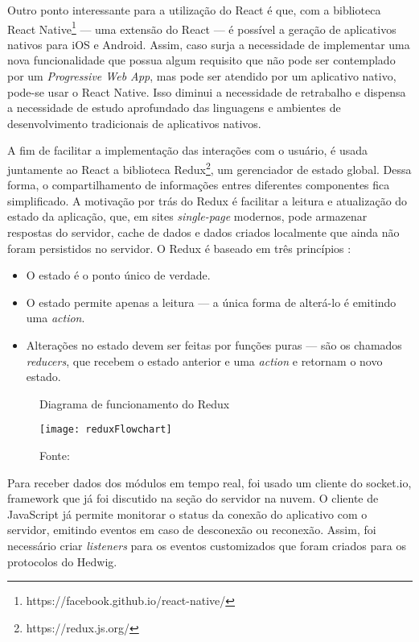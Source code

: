 Outro ponto interessante para a utilização do React é que, com a biblioteca React Native\footnote{https://facebook.github.io/react-native/} --- uma extensão do React --- é possível a geração de aplicativos nativos para iOS e Android. Assim, caso surja a necessidade de implementar uma nova funcionalidade que possua algum requisito que não pode ser contemplado por um \textit{Progressive Web App}, mas pode ser atendido por um aplicativo nativo, pode-se usar o React Native. Isso diminui a necessidade de retrabalho e dispensa a necessidade de estudo aprofundado das linguagens e ambientes de desenvolvimento tradicionais de aplicativos nativos.

A fim de facilitar a implementação das interações com o usuário, é usada juntamente ao React a biblioteca Redux\footnote{https://redux.js.org/}, um gerenciador de estado global. Dessa forma, o compartilhamento de informações entres diferentes componentes fica simplificado. A motivação por trás do Redux é facilitar a leitura e atualização do estado da aplicação, que, em sites \textit{single-page} modernos, pode armazenar respostas do servidor, cache de dados e dados criados localmente que ainda não foram persistidos no servidor. O Redux é baseado em três princípios \cite{redux}:

\begin{itemize}
\item O estado é o ponto único de verdade.
\item O estado permite apenas a leitura --- a única forma de alterá-lo é emitindo uma \textit{action}.
\item Alterações no estado devem ser feitas por funções puras --- são os chamados \textit{reducers}, que recebem o estado anterior e uma \textit{action} e retornam o novo estado.
\end{itemize}

\begin{figure}
	\centering
	\caption{Diagrama de funcionamento do Redux}
  \texttt{[image: reduxFlowchart]}
  \caption*{Fonte: \cite{reduxdataflow}}
\label{fig:reduxFlowchart}
\end{figure}

Para receber dados dos módulos em tempo real, foi usado um cliente do socket.io, framework que já foi discutido na seção do servidor na nuvem. O cliente de JavaScript já permite monitorar o status da conexão do aplicativo com o servidor, emitindo eventos em caso de desconexão ou reconexão. Assim, foi necessário criar \textit{listeners} para os eventos customizados que foram criados para os protocolos do Hedwig.

